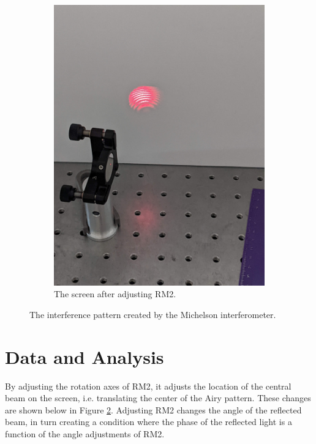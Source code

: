 \documentclass[notitlepage]{report}
\begin{document}
\begin{figure}[p]
\begin{subfigure}[b]{0.49\textwidth}
			\includegraphics[width=\linewidth]{PXL_20210204_220945838}
			\caption{The screen after adjusting RM2.}
			\label{fig:interferencetweaked}
		\end{subfigure}
		\caption{The interference pattern created by the Michelson interferometer.}
		\label{fig:rm2adjustment}
	\end{figure}

	
	\section{Data and Analysis}
	
	By adjusting the rotation axes of RM2, it adjusts the location of the central beam on the screen, i.e.  translating the center of the Airy pattern. These changes are shown below in Figure \ref{fig:rm2adjustment}. Adjusting RM2 changes the angle of the reflected beam, in turn creating a condition where the phase of the reflected light is a function of the angle adjustments of RM2. 
	
\end{document}
